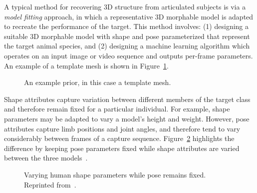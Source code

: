 
A typical method for recovering 3D structure from articulated subjects is via a \emph{model fitting} approach, in which a representative 3D morphable model is adapted to recreate the performance of the target. This method involves: (1) designing a suitable 3D morphable model with shape and pose parameterized that represent the target animal species, and (2) designing a machine learning algorithm which operates on an input image or video sequence and outputs per-frame parameters. An example of a template mesh is shown in Figure~\ref{fig:arap_template}.

\begin{figure}[t] %
    \caption{An example prior, in this case a template mesh.}
    \label{fig:arap_template}
\end{figure}

Shape attributes capture variation between different members of the target class and therefore remain fixed for a particular individual. For example, shape parameters may be adapted to vary a model's height and weight. However, pose attributes capture limb positions and joint angles, and therefore tend to vary considerably between frames of a capture sequence. Figure~\ref{fig:black_shape} highlights the difference by keeping pose parameters fixed while shape attributes are varied between the three models~\cite{Streuber:SIGGRAPH:2016}.

\begin{figure}[t] %
    \caption{Varying human shape parameters while pose remains fixed. Reprinted from~\cite{Streuber:SIGGRAPH:2016}.}
    \label{fig:black_shape}
\end{figure}


